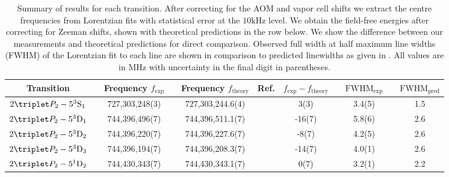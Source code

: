 \begin{table}[t]
\caption{Summary of results for each transition.
	After correcting for the AOM and vapor cell shifts we extract the centre frequencies from Lorentzian fits with statistical error at the $10\textrm{kHz}$ level.
	We obtain the field-free energies after correcting for Zeeman shifts, shown with theoretical predictions in the row below.
	We show the difference between our measurements and theoretical predictions for direct comparison.
	Observed full width at half maximum line widths (FWHM) of the Lorentzian fit to each line are shown in comparison to predicted linewidths as given in \cite{Drake07}.
	All values are in MHz with uncertainty in the final digit in parentheses.}
        \begin{tabular}{c c c c c c c c c c c}
      \hline\hline
      Transition                        & &  Frequency $f_\textrm{exp}$ & &  Frequency $f_\textrm{theory}$ & Ref.
	&  $f_\textrm{exp}-f_\textrm{theory}$      & &  $\textrm{FWHM}_{\textrm{exp}}$  & &  $\textrm{FWHM}_{{\textrm{pred}}}$ \\
      \hline
        $2\triplet P_2 - 5^3\mathrm{S}_1$ & &  {727,303,248(3)} & &  727,303,244.6(4)   & \cite{Drake07} &  {3(3)}    & &  3.4(5)  & &  1.5\\ %
        $2\triplet P_2 - 5^3\mathrm{D}_1$ & &  {744,396,496(7)} & &  744,396,511.1(7)   & \cite{Yerokhin20} &  {-16(7)}    & &  5.8(6)  & &  2.6\\
        $2\triplet P_2 - 5^3\mathrm{D}_2$ & &  {744,396,220(7)} & &  744,396,227.6(7)   & \cite{Yerokhin20} &  {-8(7)}    & &  4.2(5)  & &  2.6\\
        $2\triplet P_2 - 5^3\mathrm{D}_3$ & &  {744,396,194(7)} & &  744,396,208.3(7)   & \cite{Yerokhin20} &  {-14(7)}    & &  4.0(1)  & &  2.6\\
        $2\triplet P_2 - 5^1\mathrm{D}_2$ & &  {744,430,343(7)} & &  744,430,343.1(7)   & \cite{Yerokhin20} &  {0(7)}    & &  3.2(1)  & &  2.2\\  %
      \hline\hline
    \end{tabular}
  
  \label{tab:results}
\end{table}
